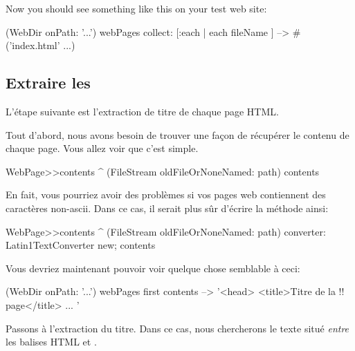 \documentclass[a4paper,10pt,twoside]{book}
\begin{document}
Now you should see something like this on your test web site:

\begin{code}{}
(WebDir onPath: '...') webPages collect: [:each | each fileName ]
  --> #('index.html' ...)
\end{code}

\subsection{Extraire les \regexmatches}

L'étape suivante est l'extraction de titre de chaque page HTML.

Tout d'abord, nous avons besoin de trouver une façon de récupérer le
contenu de chaque page. Vous allez voir que c'est simple.


\begin{code}{}
WebPage>>contents
	^ (FileStream oldFileOrNoneNamed: path) contents
\end{code}

En fait, vous pourriez avoir des problèmes si vos pages web
contiennent des caractères non-ascii. Dans ce cas, il serait plus sûr
d'écrire la méthode ainsi:

\begin{code}{}
WebPage>>contents
	^ (FileStream oldFileOrNoneNamed: path)
		converter: Latin1TextConverter new;
		contents
\end{code}

Vous devriez maintenant pouvoir voir quelque chose semblable à ceci:

\begin{code}{}
(WebDir onPath: '...') webPages first contents --> '<head>
<title>Titre de la !! page</title>
...
'
\end{code}

Passons à l'extraction du titre. Dans ce cas, nous chercherons le
texte situé \emph{entre} les balises HTML  et . 
\end{document}
